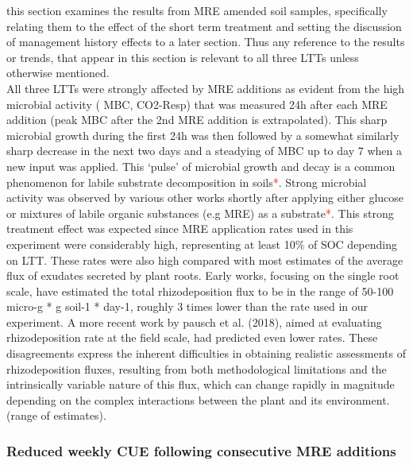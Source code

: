 \documentclass[12pt]{report}
\newcommand{\myRed}[1]{\textcolor{red}{#1}} %
\begin{document}
		
		this section examines the results from MRE amended soil samples, specifically relating them to the effect of the short term treatment and setting the discussion of management history effects to a later section. Thus any reference to the results or trends, that appear in this section is relevant to all three LTTs unless otherwise mentioned.\\    
		All three LTTs were strongly affected by MRE additions as evident from the high microbial activity ( MBC, CO2-Resp) that was measured 24h after each MRE addition (peak MBC after the 2nd MRE addition is extrapolated). This sharp microbial growth during the first 24h was then followed by a somewhat similarly sharp decrease  in the next two days and a steadying of MBC up to day 7 when a new input was applied. This ‘pulse’ of microbial growth and  decay is a common phenomenon for labile substrate decomposition in soils\myRed{*}.   
		Strong microbial activity was  observed by various other works shortly after applying either glucose or mixtures of labile organic substances (e.g MRE) as a substrate\myRed{*}.
		This strong treatment effect was expected since MRE application rates used in this experiment were considerably high, representing at least 10\% of SOC depending on LTT. These rates were also high compared with most estimates of the average flux of exudates secreted by plant roots. Early works, focusing on the single root scale, have estimated the total rhizodeposition flux to be in the range of 50-100 micro-g * g soil-1 * day-1, roughly 3 times lower than the rate used in our experiment. A more recent work by pausch et al. (2018), aimed at evaluating rhizodeposition rate at the field scale, had predicted even lower rates. These disagreements express the inherent difficulties in obtaining realistic assessments of rhizodeposition fluxes, resulting from both methodological limitations and the intrinsically variable nature of this flux, which can change rapidly in magnitude depending  on the complex interactions between the plant and its environment.     (range of estimates).
		
		\subsubsection{Reduced weekly CUE following consecutive MRE additions}
			
\end{document}
